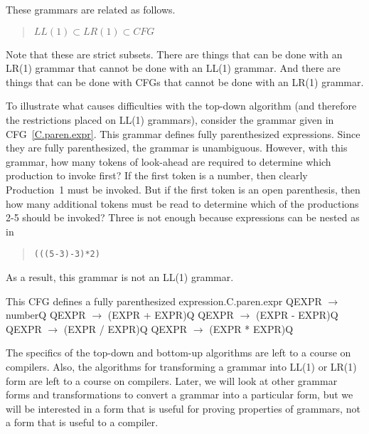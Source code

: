 \documentclass[letterpaper,12pt,openany,reqno]{book}%
\newcommand{\code}[1] {\lstinline[breaklines=yes,breakatwhitespace=yes]{#1}}
\newcommand{\cfgprod}[2] {{\ttfamily #1} $\rightarrow$ {\ttfamily #2}}
\begin{document}
These grammars are related as follows.
\begin{quote}
$LL(1) \subset LR(1) \subset CFG$
\end{quote}
Note that these are strict subsets. There are things that can be done with an LR(1) grammar that cannot be done with an LL(1) grammar. And there are things that can be done with CFGs that cannot be done with an LR(1) grammar.

To illustrate what causes difficulties with the top-down algorithm (and therefore the restrictions placed on LL(1) grammars), consider the grammar given in CFG~\ref{C.paren.expr}. This grammar defines fully parenthesized expressions. Since they are fully parenthesized, the grammar is unambiguous. However, with this grammar, how many tokens of look-ahead are required to determine which production to invoke first? If the first token is a number, then clearly Production~1 must be invoked. But if the first token is an open parenthesis, then how many additional tokens must be read to determine which of the productions 2-5 should be invoked? Three is not enough because expressions can be nested as in 
\begin{quote}
\code{(((5-3)-3)*2)}
\end{quote}
As a result, this grammar is not an LL(1) grammar.
\begin{cfg}{This CFG defines a fully parenthesized expression.}{C.paren.expr}
Q\cfgprod{EXPR}{number}Q
Q\cfgprod{EXPR}{(EXPR + EXPR)}Q
Q\cfgprod{EXPR}{(EXPR - EXPR)}Q
Q\cfgprod{EXPR}{(EXPR / EXPR)}Q
Q\cfgprod{EXPR}{(EXPR * EXPR)}Q
\end{cfg}

The specifics of the top-down and bottom-up algorithms are left to a course on compilers. Also, the algorithms for transforming a grammar into LL(1) or LR(1) form are left to a course on compilers. Later, we will look at other grammar forms and transformations to convert a grammar into a particular form, but we will be interested in a form that is useful for proving properties of grammars, not a form that is useful to a compiler.
\end{document}

